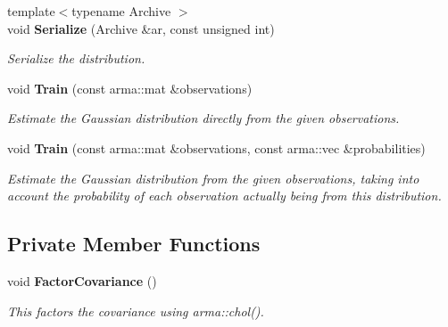 \begin{DoxyCompactItemize}
{\footnotesize template$<$typename Archive $>$ }\\void {\bf Serialize} (Archive \&ar, const unsigned int)
\begin{DoxyCompactList}\small\item\em Serialize the distribution. \end{DoxyCompactList}\item 
void {\bf Train} (const arma\+::mat \&observations)
\begin{DoxyCompactList}\small\item\em Estimate the Gaussian distribution directly from the given observations. \end{DoxyCompactList}\item 
void {\bf Train} (const arma\+::mat \&observations, const arma\+::vec \&probabilities)
\begin{DoxyCompactList}\small\item\em Estimate the Gaussian distribution from the given observations, taking into account the probability of each observation actually being from this distribution. \end{DoxyCompactList}\end{DoxyCompactItemize}
\subsection*{Private Member Functions}
\begin{DoxyCompactItemize}
\item 
void {\bf Factor\+Covariance} ()
\begin{DoxyCompactList}\small\item\em This factors the covariance using arma\+::chol(). \end{DoxyCompactList}\end{DoxyCompactItemize}
